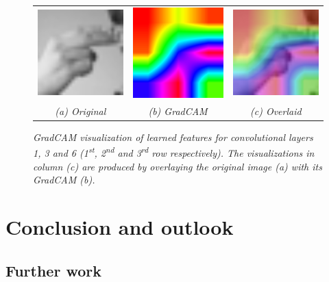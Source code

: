 \documentclass[a4paper]{article}
\newcommand{\ts}{\textsuperscript}
\begin{document}
\begin{figure}[t]
\begin{tabular}{ccc}
          \includegraphics[width=.25\linewidth]{graphics/gradcam/layer6/1_original}&\includegraphics[width=.25\linewidth]{graphics/gradcam/layer6/1_map}&\includegraphics[width=.25\linewidth]{graphics/gradcam/layer6/1_overlaid} \\
          \textit{(a) Original} & \textit{(b) GradCAM} & \textit{(c) Overlaid}
     \end{tabular}
     \caption{\textit{GradCAM visualization of learned features for convolutional layers 1, 3 and 6 (1\ts{st}, 2\ts{nd} and 3\ts{rd} row respectively). The visualizations in column (c) are produced by overlaying the original image (a) with its GradCAM (b).}}
     \label{fig:gradcam}
\end{figure}

\section{Conclusion and outlook}
\subsection{Further work}

% 
\end{document}
